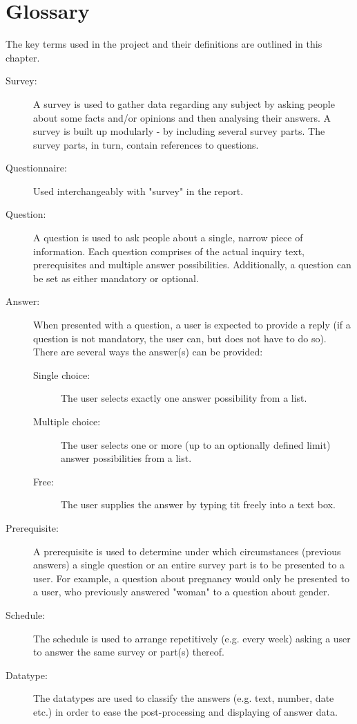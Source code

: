 \chapter{Glossary}
\label{chap:glossary}
The key terms used in the project and their definitions are outlined in this chapter.

\begin{description}
\item[Survey:] A survey is used to gather data regarding any subject by asking people about some facts and/or opinions and then analysing their answers. A survey is built up modularly - by including several survey parts. The survey parts, in turn, contain references to questions. 
\item[Questionnaire:] Used interchangeably with "survey" in the report.
\item[Question:] A question is used to ask people about a single, narrow piece of information. Each question comprises of the actual inquiry text, prerequisites and multiple answer possibilities. Additionally, a question can be set as either mandatory or optional.
\item[Answer:] When presented with a question, a user is expected to provide a reply (if a question is not mandatory, the user can, but does not have to do so). There are several ways the answer(s) can be provided:
  \begin{description}
    \item[Single choice:] The user selects exactly one answer possibility from a list.
    \item[Multiple choice:] The user selects one or more (up to an optionally defined limit) answer possibilities from a list.
    \item[Free:] The user supplies the answer by typing tit freely into a text box.
  \end{description}
\item[Prerequisite:] A prerequisite is used to determine under which circumstances (previous answers) a single question or an entire survey part is to be presented to a user. For example, a question about pregnancy would only be presented to a user, who previously answered "woman" to a question about gender.
\item[Schedule:] The schedule is used to arrange repetitively (e.g. every week) asking a user to answer the same survey or part(s) thereof.
\item[Datatype:] The datatypes are used to classify the answers (e.g. text, number, date etc.) in order to ease the post-processing and displaying of answer data.
\end{description}